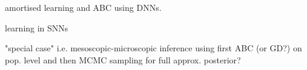 \documentclass[mphil,deptreport,ai]{infthesis} %
\begin{document}


\cite{Lueckmann2018} amortised learning and ABC using DNNs.

\cite{Taherkhani2020} learning in SNNs

\cite{Rene2020} "special case" i.e. mesoscopic-microscopic inference using first ABC (or GD?) on pop. level and then MCMC sampling for full approx. posterior?





% 
% 
% 
\end{document}
